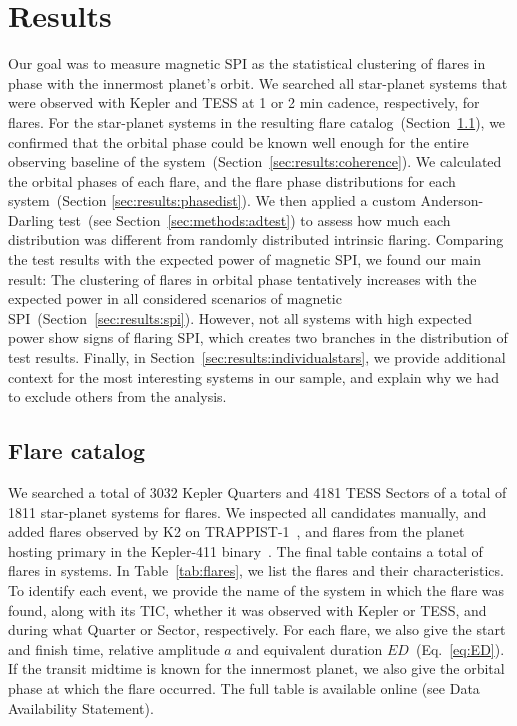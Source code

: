 \documentclass[twocolumn]{aastex631}
\begin{document}
\section{Results}
\label{sec:results}

Our goal was to measure magnetic SPI as the statistical clustering of flares in phase with the innermost planet's orbit. We searched all star-planet systems that were observed with Kepler and TESS at 1 or 2 min cadence, respectively, for flares. For the star-planet systems in the resulting flare catalog~(Section~\ref{sec:results:catalog}), we confirmed that the orbital phase could be known well enough for the entire observing baseline of the system~(Section~\ref{sec:results:coherence}). We calculated the orbital phases of each flare, and the flare phase distributions for each system~(Section \ref{sec:results:phasedist}). We then applied a custom Anderson-Darling test~(see Section~\ref{sec:methods:adtest}) to assess how much each distribution was different from randomly distributed intrinsic flaring. Comparing the test results with the expected power of magnetic SPI, we found our main result: The clustering of flares in orbital phase tentatively increases with the expected power in all considered scenarios of magnetic SPI~(Section~\ref{sec:results:spi}). However, not all systems with high expected power show signs of flaring SPI, which creates two branches in the distribution of test results. Finally, in Section~\ref{sec:results:individualstars}, we provide additional context for the most interesting systems in our sample, and explain why we had to exclude others from the analysis.

\subsection{Flare catalog}
\label{sec:results:catalog}
We searched a total of 3032 Kepler Quarters and 4181 TESS Sectors of a total of 1811 star-planet systems for flares. We inspected all candidates manually, and added flares observed by K2 on TRAPPIST-1~\citep{paudel2018k2}, and flares from the planet hosting primary in the Kepler-411 binary~\citep{jackman2021stellara}. The final table contains a total of flares in systems. In Table~\ref{tab:flares}, we list the flares and their characteristics. To identify each event, we provide the name of the system in which the flare was found, along with its TIC, whether it was observed with Kepler or TESS, and during what Quarter or Sector, respectively. For each flare, we also give the start and finish time, relative amplitude $a$ and equivalent duration $ED$~(Eq.~\ref{eq:ED}). If the transit midtime is known for the innermost planet, we also give the orbital phase at which the flare occurred. The full table is available online (see Data Availability Statement).
\end{document}
